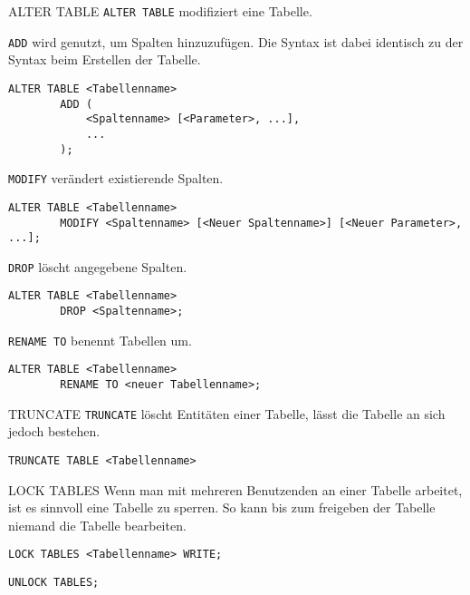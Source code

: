 \begin{sql}{ALTER TABLE}
    \texttt{ALTER TABLE} modifiziert eine Tabelle.

    \texttt{ADD} wird genutzt, um Spalten hinzuzufügen.
    Die Syntax ist dabei identisch zu der Syntax beim Erstellen der Tabelle.

    \begin{lstlisting}[language=mysql]
        ALTER TABLE <Tabellenname>
        ADD (
            <Spaltenname> [<Parameter>, ...],
            ...
        );
    \end{lstlisting}

    \texttt{MODIFY} verändert existierende Spalten.

    \begin{lstlisting}[language=mysql]
        ALTER TABLE <Tabellenname>
        MODIFY <Spaltenname> [<Neuer Spaltenname>] [<Neuer Parameter>, ...];
    \end{lstlisting}

    \texttt{DROP} löscht angegebene Spalten.

    \begin{lstlisting}[language=mysql]
        ALTER TABLE <Tabellenname>
        DROP <Spaltenname>;
    \end{lstlisting}

    \texttt{RENAME TO} benennt Tabellen um.

    \begin{lstlisting}[language=mysql]
        ALTER TABLE <Tabellenname>
        RENAME TO <neuer Tabellenname>;
    \end{lstlisting}
\end{sql}

\begin{sql}{TRUNCATE}
    \texttt{TRUNCATE} löscht Entitäten einer Tabelle, lässt die Tabelle an sich jedoch bestehen.

    \begin{lstlisting}[language=mysql]
        TRUNCATE TABLE <Tabellenname>        
    \end{lstlisting}
\end{sql}

\begin{bonus}{LOCK TABLES}
    Wenn man mit mehreren Benutzenden an einer Tabelle arbeitet, ist es sinnvoll eine Tabelle zu sperren.
    So kann bis zum freigeben der Tabelle niemand die Tabelle bearbeiten.

    \begin{lstlisting}[language=mysql]
        LOCK TABLES <Tabellenname> WRITE;
    \end{lstlisting}

    \begin{lstlisting}[language=mysql]
        UNLOCK TABLES;
    \end{lstlisting}
\end{bonus}

